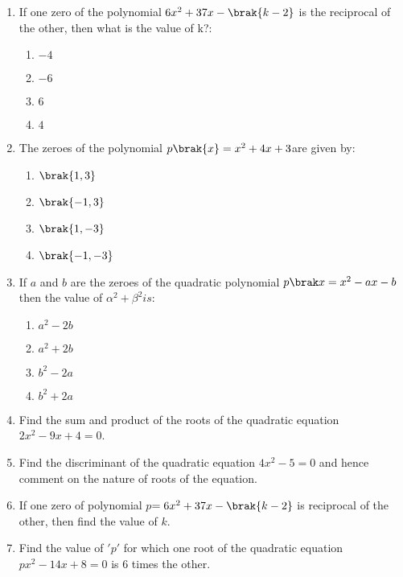 \begin{enumerate}
\item If one zero of the polynomial $6x^2 + 37x - \brak{k-2}$ is the reciprocal of the other,
    then what is the value of k?:      
    \begin{enumerate}
    \item $ -4 $          
    \item $ -6 $
    \item $ 6 $                                          
    \item $ 4 $
    \end{enumerate}
    \item The zeroes of the polynomial $p\brak{x} = x ^ 2 + 4x + 3$are given by:
    \begin{enumerate}                        
    \item $ \brak{1,3} $                            
    \item $ \brak{-1,3} $                
    \item $ \brak{1,-3} $
    \item $ \brak{-1,-3} $                                
    \end{enumerate}  


\item If $a$ and $b$ are the zeroes of the quadratic polynomial $ p\brak x = x^2 - ax - b $ then the value of $ \alpha^
    2 + \beta ^2 is $:
    \begin{enumerate}
    \item $ a^2-2b $                                  
    \item $ a^2+2b $                                  
    \item $ b^2-2a $                              
    \item $ b^2+2a $  
    \end{enumerate}
\item
Find the sum and product of the roots of the quadratic equation $2x^{2}-9x+4=0$.
\item
Find the discriminant of the quadratic equation $4x^{2}-5=0$ and hence comment on the nature of roots of the equation.
\item
If one zero of polynomial $p$$=6x^{2}+37x-\brak{k-2}$ is reciprocal of the other, then  find the value of $k$.
\item
Find the value of $'p'$ for which one root of the quadratic equation $px^{2}-14x+8=0$ is $6$ times the other.



\end{enumerate}

